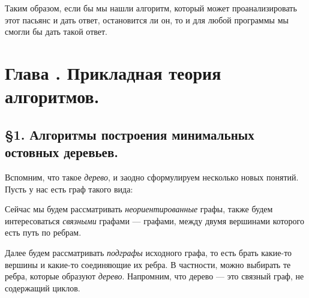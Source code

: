 \documentclass[russian]{lecture-notes}
\newcommand{\RomanNumeralCaps}[1]
{\MakeUppercase{\romannumeral #1}}
\begin{document}
	Таким образом, если бы мы нашли алгоритм, который может проанализировать этот пасьянс и дать ответ, остановится ли он,  то и для любой программы мы смогли бы дать такой ответ. 
	
	\section*{Глава \RomanNumeralCaps{5}. Прикладная теория алгоритмов.}
	
	\subsection*{\S1. Алгоритмы построения минимальных остовных деревьев.}
	
	Вспомним, что такое {\em дерево}, и заодно сформулируем несколько новых понятий. Пусть у нас есть граф такого вида:
	
	\begin{figure}[h]
		\centering
	\end{figure}
	
	Сейчас мы будем рассматривать {\em неориентированные} графы, также будем интересоваться {\em связными} графами --- графами, между двумя вершинами которого есть путь по ребрам. 
	
	Далее будем рассматривать {\em подграфы} исходного графа, то есть брать какие-то вершины и какие-то соединяющие их ребра. В частности, можно выбирать те ребра, которые образуют {\em дерево}. Напромним, что дерево --- это связный граф, не содержащий циклов. 
	
\end{document}
